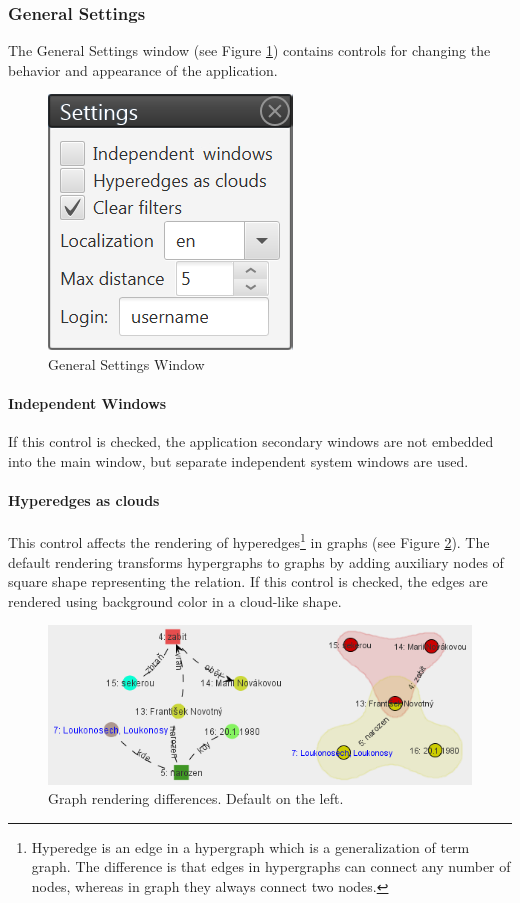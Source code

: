 \subsubsection{General Settings}
\label{sssec:GeneralSettings}

The General Settings window (see Figure \ref{fig:GeneralSettings}) contains
controls for changing the behavior and appearance of the application.

\begin{figure}[!htb]
        \centering
        \includegraphics{Images/general}
        \caption{General Settings Window}
        \label{fig:GeneralSettings}
\end{figure}

\paragraph{Independent Windows} If this control is checked, the application
secondary windows are not embedded into the main window, but separate
independent system windows are used.

\paragraph{Hyperedges as clouds} This control affects the rendering of
hyperedges\footnote{Hyperedge is an edge in a hypergraph which is a
generalization of term graph. The difference is that edges in hypergraphs can
connect any number of nodes, whereas in graph they always connect two nodes.}
in graphs (see Figure \ref{fig:Hypergraphs}). The default rendering transforms
hypergraphs to graphs by adding auxiliary nodes of square shape representing
the relation. If this control is checked, the edges are rendered using
background color in a cloud-like shape.

\begin{figure}[!htb]
        \centering
        \includegraphics[width=\textwidth]{Images/hypergraphs}
        \caption{Graph rendering differences. Default on the left.}
        \label{fig:Hypergraphs}
\end{figure}

